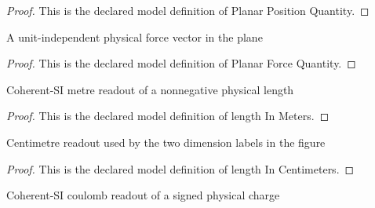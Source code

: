 \begin{proof}
  This is the declared model definition of Planar Position Quantity.
\end{proof}
\begin{definition}
  \label{def:physics:phyx-mini-0898:phyxminiproblems-problemphyxmini0898-planarforcequantity}
  A unit-independent physical force vector in the plane
\end{definition}
\begin{proof}
  This is the declared model definition of Planar Force Quantity.
\end{proof}
\begin{definition}
  \label{def:physics:phyx-mini-0898:phyxminiproblems-problemphyxmini0898-lengthinmeters}
  Coherent-SI metre readout of a nonnegative physical length
\end{definition}
\begin{proof}
  This is the declared model definition of length In Meters.
\end{proof}
\begin{definition}
  \label{def:physics:phyx-mini-0898:phyxminiproblems-problemphyxmini0898-lengthincentimeters}
  Centimetre readout used by the two dimension labels in the figure
\end{definition}
\begin{proof}
  This is the declared model definition of length In Centimeters.
\end{proof}
\begin{definition}
  \label{def:physics:phyx-mini-0898:phyxminiproblems-problemphyxmini0898-chargeincoulombs}
  Coherent-SI coulomb readout of a signed physical charge
\end{definition}
